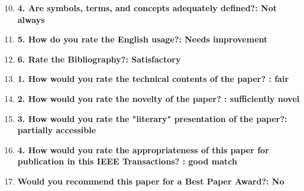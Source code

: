 \documentclass[12pt]{article}
\begin{document}
\begin{enumerate}
\setcounter{enumi}{9}

\item  \textbf{4. Are symbols, terms, and concepts adequately defined?: Not always}

\item \textbf{5. How do you rate the English usage?: Needs improvement}

\item \textbf{6. Rate the Bibliography?: Satisfactory}

\item \textbf{1. How would you rate the technical contents of the paper? : fair}

\item \textbf{2. How would you rate the novelty of the paper? : sufficiently novel}

\item \textbf{3. How would you rate the "literary" presentation of the paper?: partially 
accessible}

\item  \textbf{4. How would you rate the appropriateness of this paper for publication in 
this IEEE Transactions? : good match}

\item \textbf{Would you recommend this paper for a Best Paper Award?: No}

\end{enumerate}
\end{document}
